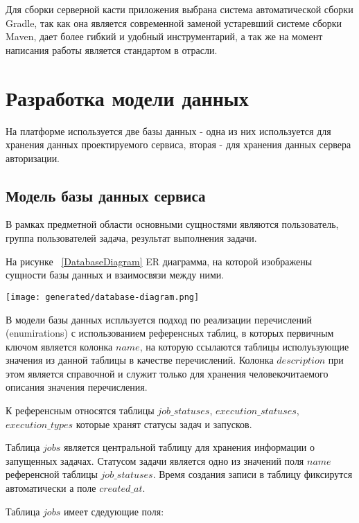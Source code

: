Для сборки серверной касти приложения выбрана система автоматической сборки Gradle, так как она является современной заменой устаревший системе сборки Maven, дает более гибкий и удобный инструментарий, а так же на момент написания работы является стандартом в отрасли. 

\section{Разработка модели данных}

На платформе используется две базы данных - одна из них используется для хранения данных проектируемого сервиса, вторая - для хранения данных сервера авторизации.

\subsection{Модель базы данных сервиса}

В рамках предметной области основными сущностями являются пользователь, группа пользователей задача, результат выполнения задачи.

На рисунке ~\ref{DatabaseDiagram} ER диаграмма, на которой изображены сущности базы данных и взаимосвязи между ними.

\begin{figure*}[!t]
  \centering
  \texttt{[image: generated/database-diagram.png]}
  \caption{Диаграмма отношений таблиц базы данных}
  \label{DatabaseDiagram}
\end{figure*}

В модели базы данных испльзуется подход по реализации перечислений (enumirations) с использованием референсных таблиц, в которых первичным ключом является колонка $name$, на которую ссылаются таблицы исполуьзующие значения из данной таблицы в качестве перечислений.
Колонка $description$ при этом является справочной и служит только для хранения человекочитаемого описания значения перечисления.

К референсным относятся таблицы $job\_statuses$, $execution\_statuses$, \linebreak $execution\_types$ которые хранят статусы задач и запусков.

Таблица $jobs$ является центральной таблицу для хранения информации о запущенных задачах. Статусом задачи является одно из значений поля $name$ референсной таблицы $job\_statuses$.
Время создания записи в таблицу фиксирутся автоматически а поле $created\_at$.

Таблица $jobs$ имеет сдедующие поля:

